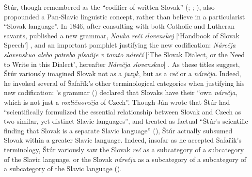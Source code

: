 Štúr, though remembered as the “codifier of written Slovak” (\cite[197--213]{jona_ludovit_1956}; \cite[265--275]{zigo_sturova_2005}; \cite[21--34]{durovic_kodifikacia_2007}), also propounded a Pan-Slavic linguistic concept, rather than believe in a particularist “Slovak language”. In 1846, after consulting with both Catholic and Lutheran savants, \citeauthor{stur_nauka_1846} published a new grammar, \textit{Nauka reči slovenskej} [‘Handbook of Slovak Speech’] \citep{stur_nauka_1846}, and an important pamphlet justifying the new codification: \textit{Nárečja slovenskuo alebo potreba písaňje v tomto nárečí} [‘The Slovak Dialect, or the Need to Write in this Dialect’, hereafter \textit{Nárečja slovenskuo}] \citep[51]{stur_narecja_1846}. As these titles suggest, Štúr variously imagined Slovak not as a \textit{jazyk}, but as a \textit{reč} or a \textit{nárečja}. Indeed, he invoked several of Šafařík’s other terminological categories when justifying his new codification: \citeauthor{stur_nauka_1846}’s grammar (\citeyear[vii]{stur_nauka_1846}) declared that Slovaks have their “own \textit{nárečja}, which is not just a \textit{rozličnorečja} of Czech”. Though Ján \citet[3]{dorula_slovencina_2011} wrote that Štúr had “scientifically formulized the essential relationship between Slovak and Czech as two similar, yet distinct Slavic languages”, and treated as factual “Štúr’s scientific finding that Slovak is a separate Slavic language” (\citeyear[5]{dorula_slovencina_2011}), Štúr actually subsumed Slovak within a greater Slavic language. Indeed, insofar as he accepted Šafařík’s terminology, Štúr variously saw the Slovak \textit{reč} as a subcategory of a subcategory of the Slavic language, or the Slovak \textit{nárečja} as a subcategory of a subcategory of a subcategory of the Slavic language (\cite[739--740]{maxwell_objectivefacts_2023}).

